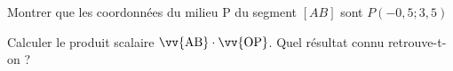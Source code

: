 \documentclass[12pt,a4paper]{article}  %
\begin{document}
\begin{enumMet}
    \item Montrer que les coordonnées du milieu P du segment $[AB]$ sont $P(-0,5;3,5)$
    \item Calculer le produit scalaire $\vv{\mathrm{AB}} \cdot \vv{\mathrm{OP}}$. Quel résultat connu retrouve-t-on ?
\end{enumMet}

\end{document}
